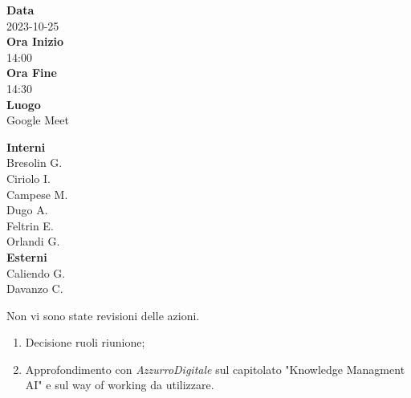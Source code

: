 \documentclass{article}
\begin{document}

\setlength{\parindent}{0mm}


\setlength{\columnsep}{2.2em}
\setlength{\columnseprule}{4pt}
\begin{paracol}{2}


\textbf{Data} \\
2023-10-25\\

\textbf{Ora Inizio} \\
14:00\\

\textbf{Ora Fine} \\
14:30\\

\textbf{Luogo} \\
Google Meet

\vspace{12.6em}


\textbf{Interni} \\
Bresolin G.\\
Ciriolo I.\\
Campese M.\\
Dugo A.\\
Feltrin E.\\
Orlandi G.\\

\textbf{Esterni} \\
Caliendo G.\\
Davanzo C.

 
\switchcolumn



\begin{enumerate}
Non vi sono state revisioni delle azioni.
\end{enumerate}

\vspace{27.2em}

\begin{enumerate}
    \item Decisione ruoli riunione; 
    \item Approfondimento con \textit{AzzurroDigitale} sul capitolato "Knowledge Managment AI" e sul way of working da utilizzare.
\end{enumerate}


\end{paracol}
\end{document}
